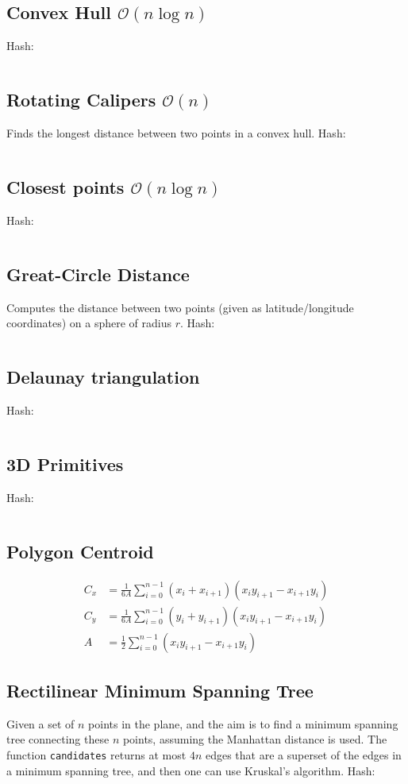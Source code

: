 \documentclass[9pt,a4paper,landscape,oneside]{amsart}
\newcommand{\mintedstyle}[2]{\inputminted{#1}{code/#2}}
\newcommand{\code}[1]{ Hash: 
\mintedstyle{cpp}{#1}}
\begin{document}
\begin{multicols*}{3}
\subsection{Convex Hull $\mathcal{O}(n \log n)$}
\code{geometry/convex_hull.cpp}

\subsection{Rotating Calipers $\mathcal{O}(n)$}
Finds the longest distance between two points in a convex hull.
\code{geometry/rotating_calipers.cpp}

\subsection{Closest points $\mathcal{O}(n \log n)$}
\code{geometry/closest_points.cpp}

\subsection{Great-Circle Distance}
Computes the distance between two points (given as latitude/longitude
coordinates) on a sphere of radius $r$.
\code{geometry/gc_distance.cpp}

\subsection{Delaunay triangulation}
\code{geometry/delaunay.cpp}

\subsection{3D Primitives}
\code{geometry/primitives3d.cpp}

\subsection{Polygon Centroid}
\begin{align*}
  C_x &= \frac{1}{6A}\sum_{i=0}^{n-1}(x_i+x_{i+1})(x_iy_{i+1} - x_{i+1}y_i) \\
  C_y &= \frac{1}{6A}\sum_{i=0}^{n-1}(y_i+y_{i+1})(x_iy_{i+1} - x_{i+1}y_i) \\
  A &= \frac12\sum_{i=0}^{n-1}(x_iy_{i+1}-x_{i+1}y_i)
\end{align*}

\subsection{Rectilinear Minimum Spanning Tree}
Given a set of $n$ points in the plane, and the aim is to find a
minimum spanning tree connecting these $n$ points, assuming the
Manhattan distance is used. The function \texttt{candidates} returns at
most $4n$ edges that are a superset of the edges in a minimum spanning
tree, and then one can use Kruskal's algorithm.
\code{geometry/rmst.cpp}


\end{multicols*}
\end{document}
